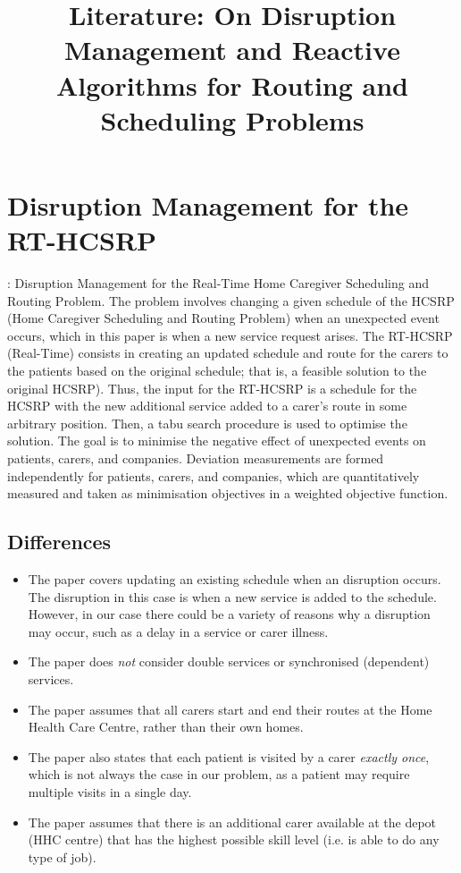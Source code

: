 \documentclass[a4paper]{article}
\begin{document}
\title{Literature: On Disruption Management and Reactive Algorithms for Routing and Scheduling Problems}
\date{}
\maketitle

\section{Disruption Management for the RT-HCSRP}
\noindent \citet{yuan2017}: Disruption Management for the Real-Time Home Caregiver Scheduling and Routing Problem. The problem involves changing a given schedule of the HCSRP (Home Caregiver Scheduling and Routing Problem) when an unexpected event occurs, which in this paper is when a new service request arises. The RT-HCSRP (Real-Time) consists in creating an updated schedule and route for the carers to the patients based on the original schedule; that is, a feasible solution to the original HCSRP). Thus, the input for the RT-HCSRP is a schedule for the HCSRP with the new additional service added to a carer's route in some arbitrary position. Then, a tabu search procedure is used to optimise the solution. The goal is to minimise the negative effect of unexpected events on patients, carers, and companies. Deviation measurements are formed independently for patients, carers, and companies, which are quantitatively measured and taken as minimisation objectives in a weighted objective function.

\subsection{Differences}
\begin{itemize}[label=\textcolor{myPurple}{\textbullet},leftmargin=*,itemsep=-0.1em]
	\item The paper covers updating an existing schedule when an disruption occurs. The disruption in this case is when a new service is added to the schedule. However, in our case there could be a variety of reasons why a disruption may occur, such as a delay in a service or carer illness.
	\item The paper does \emph{not} consider double services or synchronised (dependent) services.
	\item The paper assumes that all carers start and end their routes at the Home Health Care Centre, rather than their own homes.
	\item The paper also states that each patient is visited by a carer \emph{exactly once}, which is not always the case in our problem, as a patient may require multiple visits in a single day.	
	\item The paper assumes that there is an additional carer available at the depot (HHC centre) that has the highest possible skill level (i.e. is able to do any type of job).
\end{itemize}
\end{document}
